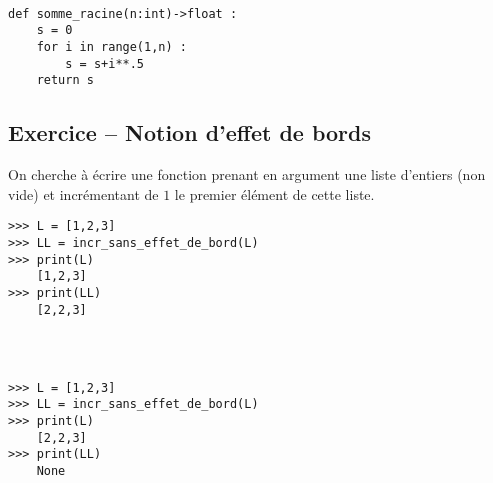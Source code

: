 \ifprof
\begin{corrige}~\\
\begin{lstlisting}
def somme_racine(n:int)->float :
    s = 0
    for i in range(1,n) :
        s = s+i**.5
    return s
\end{lstlisting}
\end{corrige}
\else
\fi

\subsection*{Exercice -- Notion d'effet de bords}

On cherche à écrire une fonction prenant en argument une liste d'entiers (non vide) et incrémentant de $1$ le premier élément de cette liste.


\begin{lstlisting}
>>> L = [1,2,3]
>>> LL = incr_sans_effet_de_bord(L)
>>> print(L)
    [1,2,3]
>>> print(LL)
    [2,2,3]
\end{lstlisting}


\ifprof
\begin{corrige}~\\
\begin{lstlisting}
\end{lstlisting}
\end{corrige}
\else
\fi


\begin{lstlisting}
>>> L = [1,2,3]
>>> LL = incr_sans_effet_de_bord(L)
>>> print(L)
    [2,2,3]
>>> print(LL)
    None
\end{lstlisting}
\ifprof
\begin{corrige}~\\
\begin{lstlisting}
\end{lstlisting}
\end{corrige}
\else
\fi



